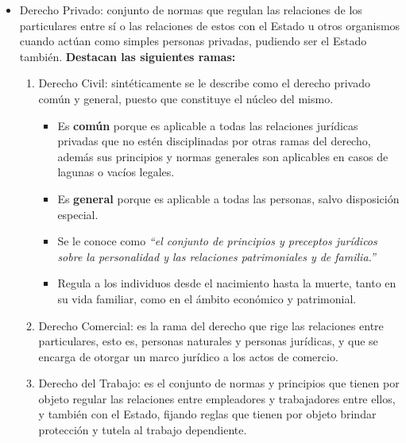 \documentclass{templateApunte}
\begin{document}
\begin{itemize}
  \item Derecho Privado: conjunto de normas que regulan las relaciones de los particulares entre sí o las relaciones de estos con el Estado u otros organismos cuando actúan como simples personas privadas, pudiendo ser el Estado también.
  \textbf{Destacan las siguientes ramas:}
  \begin{enumerate}[label=\alph*)-]
    \item Derecho Civil: sintéticamente se le describe como el derecho privado común y general, puesto que constituye el núcleo del mismo.
    \begin{itemize}
      \item Es \textbf{común} porque es aplicable a todas las relaciones jurídicas privadas que no estén disciplinadas por otras ramas del derecho, además sus principios y normas generales son aplicables en casos de lagunas o vacíos legales.
      \item Es \textbf{general} porque es aplicable a todas las personas, salvo disposición especial.
      \item Se le conoce como \textit{``el conjunto de principios y preceptos jurídicos sobre la personalidad y las relaciones patrimoniales y de familia.''}
      \item Regula a los individuos desde el nacimiento hasta la muerte, tanto en su vida familiar, como en el ámbito económico y patrimonial.
    \end{itemize}

    \item Derecho Comercial: es la rama del derecho que rige las relaciones entre particulares, esto es, personas naturales y personas jurídicas, y que se encarga de otorgar un marco jurídico a los actos de comercio.
    
    \item Derecho del Trabajo: es el conjunto de normas y principios que tienen por objeto regular las relaciones entre empleadores y trabajadores entre ellos, y también con el Estado, fijando reglas que tienen por objeto brindar protección y tutela al trabajo dependiente.
  \end{enumerate}
\end{itemize}
\end{document}
